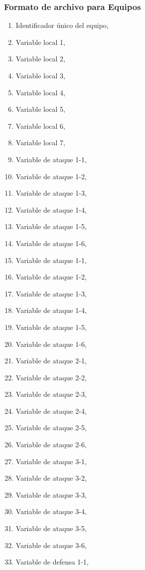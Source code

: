 \subsubsection{Formato de archivo para Equipos}

\begin{enumerate}
	\item Identificador único del equipo, 
	\item Variable local 1,
	\item Variable local 2,
	\item Variable local 3,
	\item Variable local 4,
	\item Variable local 5,
	\item Variable local 6,
	\item Variable local 7,
	\item Variable de ataque 1-1, 
	\item Variable de ataque 1-2,
	\item Variable de ataque 1-3, 
	\item Variable de ataque 1-4, 
	\item Variable de ataque 1-5, 
	\item Variable de ataque 1-6, 
	\item Variable de ataque 1-1, 
	\item Variable de ataque 1-2, 
	\item Variable de ataque 1-3, 
	\item Variable de ataque 1-4, 
	\item Variable de ataque 1-5, 
	\item Variable de ataque 1-6,
	\item Variable de ataque 2-1,
	\item Variable de ataque 2-2,
	\item Variable de ataque 2-3,
	\item Variable de ataque 2-4,
	\item Variable de ataque 2-5, 
	\item Variable de ataque 2-6, 
	\item Variable de ataque 3-1, 
	\item Variable de ataque 3-2, 
	\item Variable de ataque 3-3, 
	\item Variable de ataque 3-4, 
	\item Variable de ataque 3-5, 
	\item Variable de ataque 3-6, 
	\item Variable de defensa 1-1, 

\end{enumerate}
